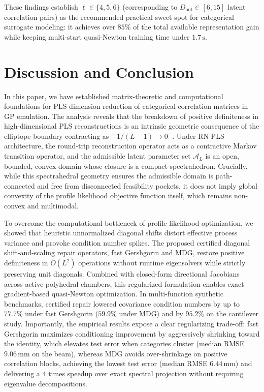 \documentclass[default,sn-mathphys,Numbered]{sn-jnl}
\theoremstyle{thmstyleone}
\theoremstyle{thmstylethree}
\theoremstyle{thmstyletwo}
\newcommand{\outp}{\text{out}}
\begin{document}
These findings establish $\ell \in \{4, 5, 6\}$ (corresponding to $D_{\outp} \in [6, 15]$ latent correlation pairs) as the recommended practical sweet spot for categorical surrogate modeling: it achieves over $85\%$ of the total available representation gain while keeping multi-start quasi-Newton training time under $1.7\,\mathrm{s}$.

\section{Discussion and Conclusion}
\label{sec:conclu}

In this paper, we have established matrix-theoretic and computational foundations for PLS dimension reduction of categorical correlation matrices in GP emulation. The analysis reveals that the breakdown of positive definiteness in high-dimensional PLS reconstructions is an intrinsic geometric consequence of the elliptope boundary contracting as $-1/(L-1) \to 0^-$. Under RN-PLS architecture, the round-trip reconstruction operator acts as a contractive Markov transition operator, and the admissible latent parameter set $\mathcal{A}_L$ is an open, bounded, convex domain whose closure is a compact spectrahedron. Crucially, while this spectrahedral geometry ensures the admissible domain is path-connected and free from disconnected feasibility pockets, it does not imply global convexity of the profile likelihood objective function itself, which remains non-convex and multimodal.

To overcome the computational bottleneck of profile likelihood optimization, we showed that heuristic unnormalized diagonal shifts distort effective process variance and provoke condition number spikes. The proposed certified diagonal shift-and-scaling repair operators, fast Gershgorin and MDG, restore positive definiteness in $O(L^2)$ operations without runtime eigensolvers while strictly preserving unit diagonals. Combined with closed-form directional Jacobians across active polyhedral chambers, this regularized formulation enables exact gradient-based quasi-Newton optimization. In multi-function synthetic benchmarks, certified repair lowered covariance condition numbers by up to $77.7\%$ under fast Gershgorin ($59.9\%$ under MDG) and by $95.2\%$ on the cantilever study. Importantly, the empirical results expose a clear regularizing trade-off: fast Gershgorin maximizes conditioning improvement by aggressively shrinking toward the identity, which elevates test error when categories cluster (median RMSE $9.06\,\mathrm{mm}$ on the beam), whereas MDG avoids over-shrinkage on positive correlation blocks, achieving the lowest test error (median RMSE $6.44\,\mathrm{mm}$) and delivering a $4$ times speedup over exact spectral projection without requiring eigenvalue decompositions.
\end{document}
